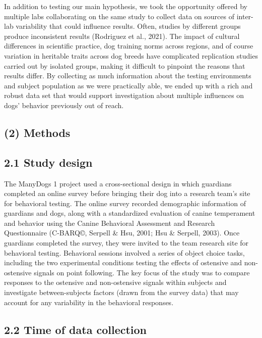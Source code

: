 \documentclass[
  pub,floatsintext]{apa6}
\begin{document}
In addition to testing our main hypothesis, we took the opportunity offered by multiple labs collaborating on the same study to collect data on sources of inter-lab variability that could influence results. Often, studies by different groups produce inconsistent results (Rodriguez et al., 2021). The impact of cultural differences in scientific practice, dog training norms across regions, and of course variation in heritable traits across dog breeds have complicated replication studies carried out by isolated groups, making it difficult to pinpoint the reasons that results differ. By collecting as much information about the testing environments and subject population as we were practically able, we ended up with a rich and robust data set that would support investigation about multiple influences on dogs' behavior previously out of reach.~

\hypertarget{methods}{%
\subsection{(2) Methods}\label{methods}}

\hypertarget{study-design}{%
\subsection{2.1 Study design}\label{study-design}}

The ManyDogs 1 project used a cross-sectional design in which guardians completed an online survey before bringing their dog into a research team's site for behavioral testing. The online survey recorded demographic information of guardians and dogs, along with a standardized evaluation of canine temperament and behavior using the Canine Behavioral Assessment and Research Questionnaire (C-BARQ©, Serpell \& Hsu, 2001; Hsu \& Serpell, 2003). Once guardians completed the survey, they were invited to the team research site for behavioral testing. Behavioral sessions involved a series of object choice tasks, including the two experimental conditions testing the effects of ostensive and non-ostensive signals on point following. The key focus of the study was to compare responses to the ostensive and non-ostensive signals within subjects and investigate between-subjects factors (drawn from the survey data) that may account for any variability in the behavioral responses.

\hypertarget{time-of-data-collection}{%
\subsection{2.2 Time of data collection}\label{time-of-data-collection}}
\end{document}
